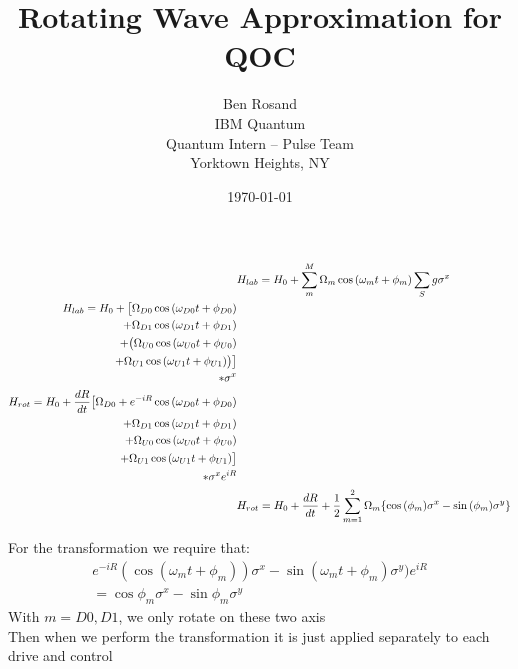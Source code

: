\documentclass[12pt]{article}
\title{Rotating Wave Approximation for QOC}
\author{
        Ben Rosand \\
        IBM Quantum \\
        Quantum Intern -- Pulse Team\\
        Yorktown Heights, NY
}
\date{\today}
\begin{document}
\maketitle


\begin{align}
        & H_{lab} = H_0 + \sum_m^M \Omega_m \cos{(\omega_m t + \phi_m)} \sum_S g \sigma^x\\
        \begin{split}
            H_{lab} = H_0 + \big[\Omega_{D0} \cos{(\omega_{D0} t + \phi_{D0})}\\
                          + \Omega_{D1} \cos{(\omega_{D1} t + \phi_{D1})}\\
                          + \big(\Omega_{U0} \cos{(\omega_{U0} t + \phi_{U0})}\\
                          + \Omega_{U1} \cos{(\omega_{U1} t + \phi_{U1})}\big)\big]\\
                          * \sigma^x
        \end{split} \\
        \begin{split}
            H_{rot} = H_0 + \frac{dR}{dt} \big[\Omega_{D0} + e^{-iR} \cos{(\omega_{D0} t + \phi_{D0})}\\
                          + \Omega_{D1} \cos{(\omega_{D1} t + \phi_{D1})}\\
                          + \Omega_{U0} \cos{(\omega_{U0} t + \phi_{U0})}\\
                          + \Omega_{U1} \cos{(\omega_{U1} t + \phi_{U1})}\big]\\
                          * \sigma^x e^{iR}
        \end{split} \\
        & H_{rot} = H_0 + \frac{dR}{dt}+ \frac{1}{2}
         \sum_{m=1}^2 \Omega_m \qty{\cos{(\phi_m)} \sigma^x - \sin{(\phi_m)} \sigma^y}\\
\end{align}


For the transformation we require that:
\begin{equation}\label{eq:6}
    \begin{split}
        e^{-iR} (\cos{(\omega_m t + \phi_m)}) \sigma^x - \sin{(\omega_m t + \phi_m)} \sigma^y) e^{iR} \\
        = \cos{\phi_m} \sigma^x - \sin{\phi_m} \sigma^y
    \end{split}
\end{equation}
With $m = {D0, D1}$, we only rotate on these two axis\\
Then when we perform the transformation it is just applied separately to each drive and control
\end{document}
